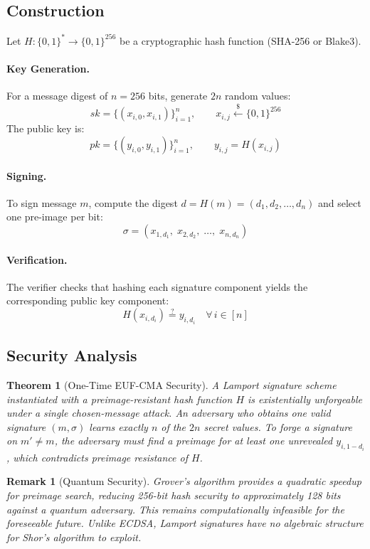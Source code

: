 \documentclass[11pt,a4paper]{article}
\newtheorem{theorem}{Theorem}[section]
\newtheorem{remark}{Remark}[section]
\begin{document}
\subsection{Construction}

Let $H: \{0,1\}^* \rightarrow \{0,1\}^{256}$ be a cryptographic hash
function (SHA-256 or Blake3).

\paragraph{Key Generation.}
For a message digest of $n = 256$ bits, generate $2n$ random values:
\[
\mathit{sk} = \bigl\{(x_{i,0}, x_{i,1})\bigr\}_{i=1}^{n},
\qquad x_{i,j} \xleftarrow{\$} \{0,1\}^{256}
\]
The public key is:
\[
\mathit{pk} = \bigl\{(y_{i,0}, y_{i,1})\bigr\}_{i=1}^{n},
\qquad y_{i,j} = H(x_{i,j})
\]

\paragraph{Signing.}
To sign message $m$, compute the digest $d = H(m) = (d_1, d_2,
\ldots, d_n)$ and select one pre-image per bit:
\[
\sigma = (x_{1,d_1},\; x_{2,d_2},\; \ldots,\; x_{n,d_n})
\]

\paragraph{Verification.}
The verifier checks that hashing each signature component yields the
corresponding public key component:
\[
H(x_{i,d_i}) \stackrel{?}{=} y_{i,d_i} \quad \forall\, i \in [n]
\]

\subsection{Security Analysis}

\begin{theorem}[One-Time EUF-CMA Security]
A Lamport signature scheme instantiated with a preimage-resistant hash
function $H$ is existentially unforgeable under a single chosen-message
attack. An adversary who obtains one valid signature $(m, \sigma)$
learns exactly $n$ of the $2n$ secret values. To forge a signature on
$m' \neq m$, the adversary must find a preimage for at least one
unrevealed $y_{i,1-d_i}$, which contradicts preimage resistance of $H$.
\end{theorem}

\begin{remark}[Quantum Security]
Grover's algorithm provides a quadratic speedup for preimage search,
reducing 256-bit hash security to approximately 128 bits against a
quantum adversary. This remains computationally infeasible for the
foreseeable future. Unlike ECDSA, Lamport signatures have no
algebraic structure for Shor's algorithm to exploit.
\end{remark}
\end{document}
